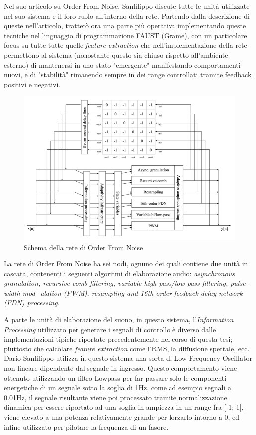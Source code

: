 Nel suo articolo su Order From Noise, Sanfilippo discute tutte le unità utilizzate
nel suo sistema e il loro ruolo all'interno della rete.
Partendo dalla descrizione di queste nell'articolo, tratterò ora una parte più operativa 
implementando queste tecniche nel linguaggio di programmazione FAUST (Grame), 
con un particolare focus su tutte tutte quelle \textit{feature extraction}
che nell'implementazione della rete permettono al sistema 
(nonostante questo sia chiuso rispetto all'ambiente esterno) 
di mantenersi in uno stato "emergente" manifestando comportamenti nuovi,
e di "stabilità" rimanendo sempre in dei range controllati tramite feedback positivi e negativi.

\begin{figure}[h!]
\begin{center}
    \includegraphics[width=14cm]{figures/OFNnetwork.pdf}
    \caption{Schema della rete di Order From Noise}
    \end{center}
\end{figure}

La rete di Order From Noise ha sei nodi, ognuno dei quali contiene due unità in cascata, 
contenenti i seguenti algoritmi di elaborazione audio: 
\textit{asynchronous granulation, recursive comb filtering, variable high-pass/low-pass filtering, pulse-width mod-
ulation (PWM), resampling and 16th-order feedback delay network (FDN) processing.} 

A parte le unità di elaborazione del suono,
in questo sistema, l'\textit{Information Processing} utilizzato per generare i 
segnali di controllo è diverso
dalle implementazioni tipiche riportate precedentemente nel corso di questa tesi;
piuttosto che calcolare \textit{feature extraction} come l'RMS, la diffusione spettale, ecc. 
Dario Sanfilippo utilizza in questo sistema una sorta di Low Frequency Oscillator
non lineare dipendente dal segnale in ingresso.
Questo comportamento viene ottenuto utilizzando un filtro Lowpass per far 
passare solo le componenti energetiche di un segnale sotto la soglia di 1Hz,
come ad esempio segnali a 0.01Hz, il segnale risultante viene poi processato
tramite normalizzazione dinamica per essere riportato ad una soglia in ampiezza
in un range fra [-1; 1],
viene elevato a una potenza relativamente grande per forzarlo intorno a 0,
ed infine utilizzato per pilotare la frequenza di un fasore.

